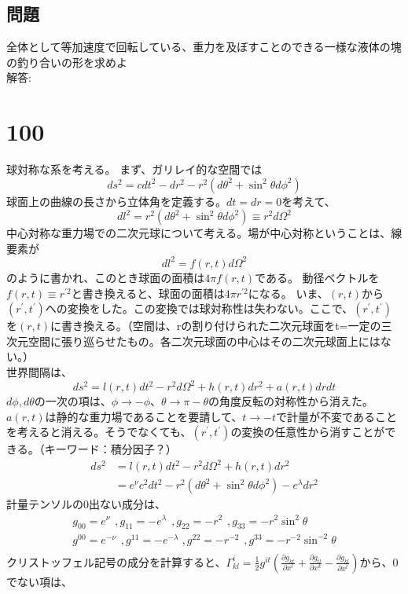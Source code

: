 \documentclass{jsarticle}
\newcommand{\pder}[2][]{\frac{\partial#1}{\partial#2}}
\newcommand{\pderx}[2][]{\pder[#1]{x^{#2}}}
\newcommand{\pdergx}[2][]{\pderx[g_{#1}]{#2}}
\newcommand{\half}{\frac{1}{2}}
\newcommand{\hfpt}{\hspace{5pt}}
\newcommand{\beq}{\begin{equation}}
\newcommand{\eeq}{\end{equation}}
\begin{document}
\subsection{問題}
全体として等加速度で回転している、重力を及ぼすことのできる一様な液体の塊の釣り合いの形を求めよ\\
解答:\\
\section{100}
球対称な系を考える。
まず、ガリレイ的な空間では
\beq
ds^2 = cdt^2 - dr^2 - r^2(d\theta^2 + \sin^2\theta d\phi^2)
\eeq
球面上の曲線の長さから立体角を定義する。$dt = dr = 0$を考えて、
\beq
    dl^2 = r^2 (d\theta^2 + \sin^2\theta d\phi^2) \equiv r^2 d\Omega^2
\eeq
中心対称な重力場での二次元球について考える。場が中心対称ということは、線要素が
\beq
    dl^2 = f(r, t)d\Omega^2
\eeq
のように書かれ、このとき球面の面積は$4\pi f(r,t)$である。
動径ベクトルを$f(r, t) \equiv r^{\prime 2}$と書き換えると、球面の面積は$4\pi r^{\prime 2}$になる。
いま、$(r,t)$から$(r^\prime , t^\prime)$への変換をした。この変換では球対称性は失わない。ここで、$(r^\prime, t^\prime)$を$(r,t)$に書き換える。（空間は、rの割り付けられた二次元球面をt=一定の三次元空間に張り巡らせたもの。各二次元球面の中心はその二次元球面上にはない。）\\
世界間隔は、
\beq
ds^2 = l(r, t) dt^ 2 -r^2 d\Omega^2 + h(r, t) dr^2 + a(r, t) dr dt
\eeq
$d\phi, d\theta$の一次の項は、$\phi \rightarrow -\phi$、$\theta \rightarrow \pi - \theta$の角度反転の対称性から消えた。
$a(r, t)$は静的な重力場であることを要請して、$t \rightarrow -t$で計量が不変であることを考えると消える。そうでなくても、$(r^\prime, t^\prime)$の変換の任意性から消すことができる。（キーワード：積分因子？）
\begin{align}
    ds^2 &= l(r, t) dt^ 2 -r^2 d\Omega^2 + h(r, t) dr^2\\
         &= e^\nu c^2 dt^ 2 -r^2 (d\theta^2 + \sin^2\theta d\phi^2) - e^\lambda dr^2
\end{align}
計量テンソルの$0$出ない成分は、
\begin{align}
    g_{00} = e^\nu \hfpt , g_{11} = -e^\lambda\hfpt ,g_{22} = -r^2\hfpt ,g_{33} = -r^2 \sin^2\theta\\
    g^{00} = e^{-\nu} \hfpt , g^{11} = -e^{-\lambda\hfpt} ,g^{22} = -r^{-2}\hfpt ,g^{33} = -r^{-2} \sin^{-2}\theta\\
\end{align}
クリストッフェル記号の成分を計算すると、$\Gamma^i_{kl}=\half g^{it}(\pdergx[kt]{l} + \pdergx[tl]{k} - \pdergx[kl]{t})$から、$0$でない項は、
\end{document}
